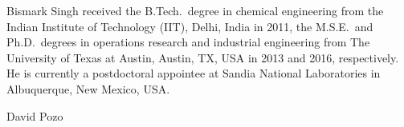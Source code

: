\documentclass[letter]{IEEEtran}
\begin{document}
\ifCLASSOPTIONcaptionsoff
  \newpage
\fi







%
%


% 

\begin{IEEEbiographynophoto}{Bismark Singh}
received the B.Tech.\ degree in chemical engineering from the Indian Institute 
of Technology (IIT), Delhi, India in 2011, the M.S.E.\ and Ph.D.\ degrees in 
operations 
research and industrial engineering from The University of Texas at 
Austin, Austin, TX, USA in 2013 and 2016, respectively. He is currently a 
postdoctoral appointee at Sandia National Laboratories in Albuquerque, New 
Mexico, USA.
\end{IEEEbiographynophoto}

\begin{IEEEbiographynophoto}{David Pozo}
\end{IEEEbiographynophoto}







\end{document}
